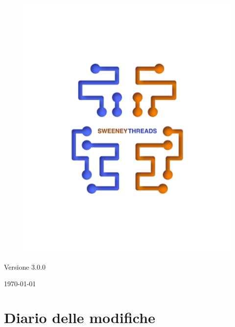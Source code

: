 \documentclass[a4paper]{article}
\begin{document}
\begin{titlepage}
		\begin{figure}[H]
			\centering
			\includegraphics[scale=0.8]{../sweeney.png}
		\end{figure}
		\begin{center}
			Versione 3.0.0
		\end{center}
		{\large \today}\\[3cm] 
		\vfill  
	\end{titlepage}
	
	\tableofcontents
	
	\newpage 
	\section*{Diario delle modifiche}
	
\end{document}
